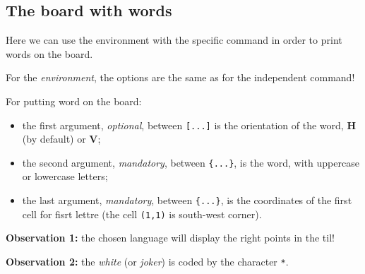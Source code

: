 \documentclass{article}
\newcommand\Cle[1]{{\bfseries\sffamily\textlangle #1\textrangle}}
\begin{document}
\newpage

\subsection{The board with words}

Here we can use the \textsf{environment} with the specific \textsf{command} in order to print words on the board.

\smallskip

For the \textit{environment}, the options are the same as for the independent \textsf{command}!

\smallskip

For putting word on the board:

\begin{itemize}
	\item the first argument, \textit{optional}, between \texttt{[...]} is the orientation of the word, \Cle{H} (by default) or \Cle{V};
	\item the second argument, \textit{mandatory}, between \texttt{\{...\}}, is the word, with uppercase or lowercase letters;
	\item the last argument, \textit{mandatory}, between \texttt{\{...\}}, is the coordinates of the first cell for fisrt lettre (the cell \texttt{(1,1)} is south-west corner).
\end{itemize}

\textbf{Observation 1:} the chosen language will display the right points in the til!

\smallskip

\textbf{Observation 2:} the \textit{white} (or \textit{joker}) is coded by the character \texttt{*}.

\begin{PresentationCode}{}
\begin{EnvScrabble}[Scale=0.75,Labels=false,Help]
\end{EnvScrabble}
\end{PresentationCode}
\end{document}
